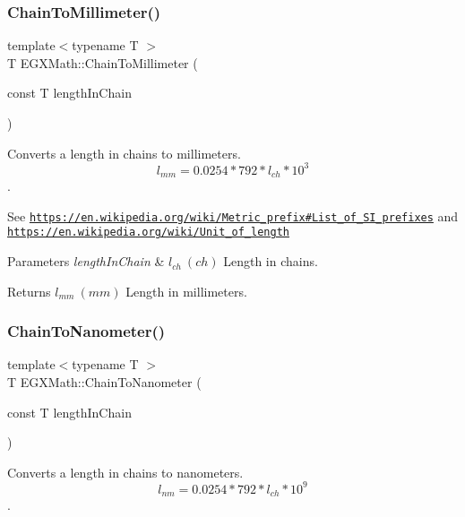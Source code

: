 \subsubsection{\texorpdfstring{Chain\+To\+Millimeter()}{ChainToMillimeter()}}
{\footnotesize\ttfamily template$<$typename T $>$ \\
T E\+G\+X\+Math\+::\+Chain\+To\+Millimeter (\begin{DoxyParamCaption}\item[{const T}]{length\+In\+Chain }\end{DoxyParamCaption})}



Converts a length in chains to millimeters. \[ l_{mm}=0.0254 * 792 * l_{ch} * 10^{3} \]. 

See \href{https://en.wikipedia.org/wiki/Metric_prefix#List_of_SI_prefixes}{\tt https\+://en.\+wikipedia.\+org/wiki/\+Metric\+\_\+prefix\#\+List\+\_\+of\+\_\+\+S\+I\+\_\+prefixes} and \href{https://en.wikipedia.org/wiki/Unit_of_length}{\tt https\+://en.\+wikipedia.\+org/wiki/\+Unit\+\_\+of\+\_\+length} 
\begin{DoxyParams}{Parameters}
{\em length\+In\+Chain} & $ l_{ch}\ (ch)$ Length in chains. \\
\hline
\end{DoxyParams}
\begin{DoxyReturn}{Returns}
$ l_{mm}\ (mm)$ Length in millimeters. 
\end{DoxyReturn}
\mbox{\label{group___e_g_x_math-_conversions-_length_conversions-_surveyors-_chain-_s_i_ga6120f342646451a0aa544d3fc3699f81}} 
\subsubsection{\texorpdfstring{Chain\+To\+Nanometer()}{ChainToNanometer()}}
{\footnotesize\ttfamily template$<$typename T $>$ \\
T E\+G\+X\+Math\+::\+Chain\+To\+Nanometer (\begin{DoxyParamCaption}\item[{const T}]{length\+In\+Chain }\end{DoxyParamCaption})}



Converts a length in chains to nanometers. \[ l_{nm}=0.0254 * 792 * l_{ch} * 10^{9} \]. 

